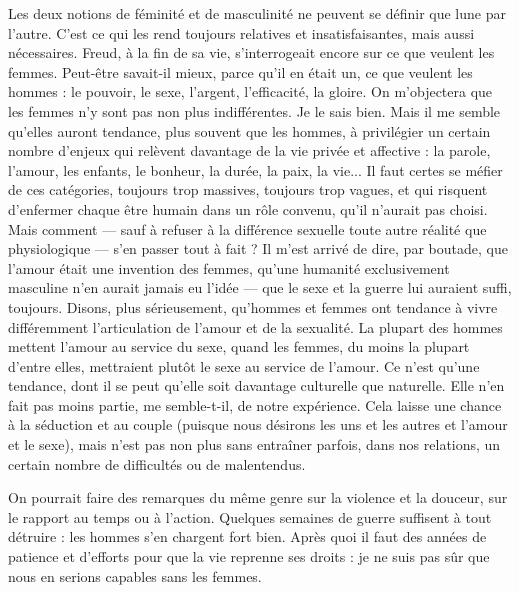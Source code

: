Les deux notions de féminité et de masculinité ne peuvent se définir que
lune par l’autre. C’est ce qui les rend toujours relatives et insatisfaisantes, mais
aussi nécessaires. Freud, à la fin de sa vie, s’interrogeait encore sur ce que veulent
les femmes. Peut-être savait-il mieux, parce qu’il en était un, ce que veulent
les hommes : le pouvoir, le sexe, l’argent, l'efficacité, la gloire. On m’objectera
que les femmes n’y sont pas non plus indifférentes. Je le sais bien. Mais il
me semble qu’elles auront tendance, plus souvent que les hommes, à privilégier
un certain nombre d’enjeux qui relèvent davantage de la vie privée et affective :
la parole, l'amour, les enfants, le bonheur, la durée, la paix, la vie... Il faut
certes se méfier de ces catégories, toujours trop massives, toujours trop vagues,
et qui risquent d’enfermer chaque être humain dans un rôle convenu, qu’il
n'aurait pas choisi. Mais comment — sauf à refuser à la différence sexuelle toute
autre réalité que physiologique — s’en passer tout à fait ? Il m’est arrivé de dire,
par boutade, que l'amour était une invention des femmes, qu’une humanité
exclusivement masculine n’en aurait jamais eu l’idée — que le sexe et la guerre
lui auraient suffi, toujours. Disons, plus sérieusement, qu’hommes et femmes
ont tendance à vivre différemment l'articulation de l’amour et de la sexualité.
La plupart des hommes mettent l'amour au service du sexe, quand les femmes,
du moins la plupart d’entre elles, mettraient plutôt le sexe au service de
l'amour. Ce n’est qu’une tendance, dont il se peut qu’elle soit davantage culturelle
que naturelle. Elle n’en fait pas moins partie, me semble-t-il, de notre
expérience. Cela laisse une chance à la séduction et au couple (puisque nous
désirons les uns et les autres et l’amour et le sexe), mais n’est pas non plus sans
entraîner parfois, dans nos relations, un certain nombre de difficultés ou de
malentendus.

On pourrait faire des remarques du même genre sur la violence et la douceur,
sur le rapport au temps ou à l’action. Quelques semaines de guerre suffisent
à tout détruire : les hommes s’en chargent fort bien. Après quoi il faut des
années de patience et d’efforts pour que la vie reprenne ses droits : je ne suis pas
sûr que nous en serions capables sans les femmes.

